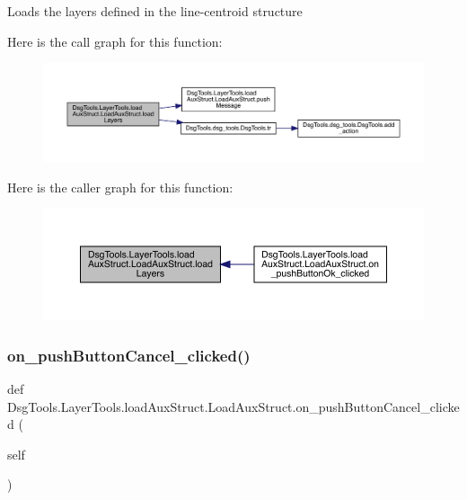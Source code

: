 \begin{DoxyVerb}Loads the layers defined in the line-centroid structure
\end{DoxyVerb}
 Here is the call graph for this function\+:
\nopagebreak
\begin{figure}[H]
\begin{center}
\leavevmode
\includegraphics[width=350pt]{class_dsg_tools_1_1_layer_tools_1_1load_aux_struct_1_1_load_aux_struct_af010d9291b14d73ddecdeb976e90726b_cgraph}
\end{center}
\end{figure}
Here is the caller graph for this function\+:
\nopagebreak
\begin{figure}[H]
\begin{center}
\leavevmode
\includegraphics[width=350pt]{class_dsg_tools_1_1_layer_tools_1_1load_aux_struct_1_1_load_aux_struct_af010d9291b14d73ddecdeb976e90726b_icgraph}
\end{center}
\end{figure}
\mbox{\label{class_dsg_tools_1_1_layer_tools_1_1load_aux_struct_1_1_load_aux_struct_a2e6d4dc34a49256e227cc9c0d397885d}} 
\subsubsection{\texorpdfstring{on\+\_\+push\+Button\+Cancel\+\_\+clicked()}{on\_pushButtonCancel\_clicked()}}
{\footnotesize\ttfamily def Dsg\+Tools.\+Layer\+Tools.\+load\+Aux\+Struct.\+Load\+Aux\+Struct.\+on\+\_\+push\+Button\+Cancel\+\_\+clicked (\begin{DoxyParamCaption}\item[{}]{self }\end{DoxyParamCaption})}

